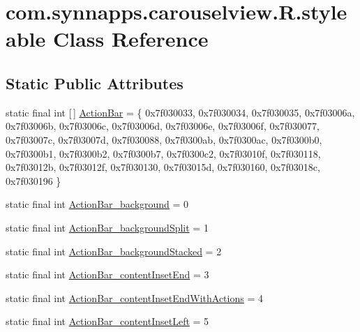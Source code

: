 \hypertarget{classcom_1_1synnapps_1_1carouselview_1_1_r_1_1styleable}{}\section{com.\+synnapps.\+carouselview.\+R.\+styleable Class Reference}
\label{classcom_1_1synnapps_1_1carouselview_1_1_r_1_1styleable}
\subsection*{Static Public Attributes}
\begin{DoxyCompactItemize}
\item 
static final int \mbox{[}$\,$\mbox{]} \mbox{\hyperlink{classcom_1_1synnapps_1_1carouselview_1_1_r_1_1styleable_aabf2a70615c0381390e9cfee5b3a8e95}{Action\+Bar}} = \{ 0x7f030033, 0x7f030034, 0x7f030035, 0x7f03006a, 0x7f03006b, 0x7f03006c, 0x7f03006d, 0x7f03006e, 0x7f03006f, 0x7f030077, 0x7f03007c, 0x7f03007d, 0x7f030088, 0x7f0300ab, 0x7f0300ac, 0x7f0300b0, 0x7f0300b1, 0x7f0300b2, 0x7f0300b7, 0x7f0300c2, 0x7f03010f, 0x7f030118, 0x7f03012b, 0x7f03012f, 0x7f030130, 0x7f03015d, 0x7f030160, 0x7f03018c, 0x7f030196 \}
\item 
static final int \mbox{\hyperlink{classcom_1_1synnapps_1_1carouselview_1_1_r_1_1styleable_a4f25ff8ca1e31f1e1db050d0cdb0833e}{Action\+Bar\+\_\+background}} = 0
\item 
static final int \mbox{\hyperlink{classcom_1_1synnapps_1_1carouselview_1_1_r_1_1styleable_aa83b1fa27ae710bde88a5b532e4c8e65}{Action\+Bar\+\_\+background\+Split}} = 1
\item 
static final int \mbox{\hyperlink{classcom_1_1synnapps_1_1carouselview_1_1_r_1_1styleable_a110468b976371b13a1be4a3ad9aff124}{Action\+Bar\+\_\+background\+Stacked}} = 2
\item 
static final int \mbox{\hyperlink{classcom_1_1synnapps_1_1carouselview_1_1_r_1_1styleable_a20242e793f173827531ee31f82549ff4}{Action\+Bar\+\_\+content\+Inset\+End}} = 3
\item 
static final int \mbox{\hyperlink{classcom_1_1synnapps_1_1carouselview_1_1_r_1_1styleable_a70a150f68ecfc1a5ba4c46e046786ffc}{Action\+Bar\+\_\+content\+Inset\+End\+With\+Actions}} = 4
\item 
static final int \mbox{\hyperlink{classcom_1_1synnapps_1_1carouselview_1_1_r_1_1styleable_adb7663b32d919090dc30d642c3b28fa3}{Action\+Bar\+\_\+content\+Inset\+Left}} = 5
\item 

\end{DoxyCompactItemize}
